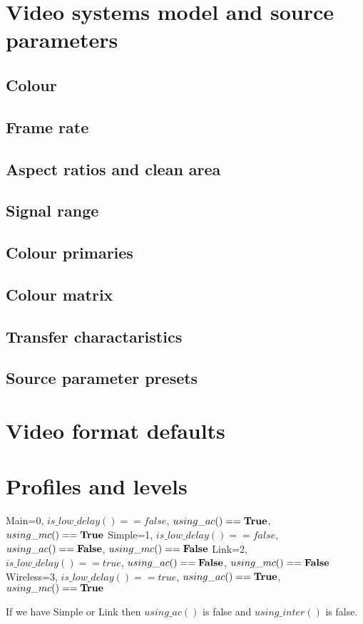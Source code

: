 \clearpage
\section{Video systems model and source parameters}

\label{vidsys}
\begin{informative*}
\subsection{Colour}
\subsection{Frame rate}
\subsection{Aspect ratios and clean area}
\subsection{Signal range}
\subsection{Colour primaries}
\subsection{Colour matrix}
\subsection{Transfer charactaristics}
\end{informative*}
\subsection{Source parameter presets}

\clearpage
\section{Video format defaults}

\clearpage
\section{Profiles and levels}\label{profilelevel}
Main=0, $is\_low\_delay()==false$, $using\_ac()==\text{\bf{True}}$, $using\_mc()==\text{\bf{True}}$
Simple=1, $is\_low\_delay()==false$, $using\_ac()==\text{\bf{False}}$, $using\_mc()==\text{\bf{False}}$
Link=2, $is\_low\_delay()==true$, $using\_ac()==\text{\bf{False}}$, $using\_mc()==\text{\bf{False}}$
Wireless=3, $is\_low\_delay()==true$, $using\_ac()==\text{\bf{True}}$, $using\_mc()==\text{\bf{True}}$

If we have Simple or Link then $using\_ac()$ is false and $using\_inter()$ is false.


